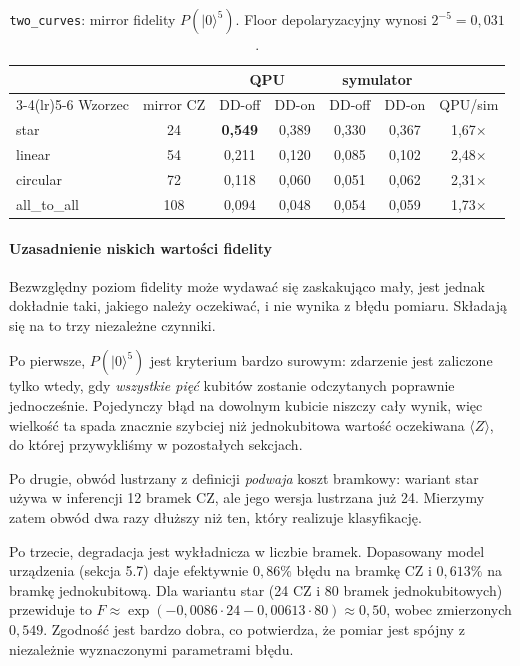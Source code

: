 \documentclass[11pt,a4paper]{article}
\begin{document}
\begin{table}[htbp]
\centering
\caption{\texttt{two\_curves}: mirror fidelity $P(|0\rangle^{5})$. Floor depolaryzacyjny
wynosi $2^{-5} = 0{,}031$.}
\begin{tabular}{@{}lc cc cc c@{}}
\toprule
& & \multicolumn{2}{c}{\textbf{QPU}} & \multicolumn{2}{c}{\textbf{symulator}} & \\
\cmidrule(lr){3-4}\cmidrule(lr){5-6}
Wzorzec & mirror CZ & DD-off & DD-on & DD-off & DD-on & QPU/sim \\
\midrule
star        & 24  & \textbf{0,549} & 0,389 & 0,330 & 0,367 & 1,67$\times$ \\
linear      & 54  & 0,211 & 0,120 & 0,085 & 0,102 & 2,48$\times$ \\
circular    & 72  & 0,118 & 0,060 & 0,051 & 0,062 & 2,31$\times$ \\
all\_to\_all & 108 & 0,094 & 0,048 & 0,054 & 0,059 & 1,73$\times$ \\
\bottomrule
\end{tabular}
\end{table}

\paragraph{Uzasadnienie niskich wartości fidelity} Bezwzględny poziom fidelity może wydawać
się zaskakująco mały, jest jednak dokładnie taki, jakiego należy oczekiwać, i nie wynika
z błędu pomiaru. Składają się na to trzy niezależne czynniki.

Po pierwsze, $P(|0\rangle^{5})$ jest kryterium bardzo surowym: zdarzenie jest zaliczone
tylko wtedy, gdy \emph{wszystkie pięć} kubitów zostanie odczytanych poprawnie
jednocześnie. Pojedynczy błąd na dowolnym kubicie niszczy cały wynik, więc wielkość ta
spada znacznie szybciej niż jednokubitowa wartość oczekiwana $\langle Z\rangle$, do której
przywykliśmy w pozostałych sekcjach.

Po drugie, obwód lustrzany z definicji \emph{podwaja} koszt bramkowy: wariant star używa
w inferencji 12 bramek CZ, ale jego wersja lustrzana już 24. Mierzymy zatem obwód dwa razy
dłuższy niż ten, który realizuje klasyfikację.

Po trzecie, degradacja jest wykładnicza w liczbie bramek. Dopasowany model urządzenia
(sekcja 5.7) daje efektywnie $0{,}86\%$ błędu na bramkę CZ i $0{,}613\%$ na bramkę
jednokubitową. Dla wariantu star (24 CZ i 80 bramek jednokubitowych) przewiduje to
$F \approx \exp(-0{,}0086\cdot 24 - 0{,}00613\cdot 80) \approx 0{,}50$, wobec zmierzonych
$0{,}549$. Zgodność jest bardzo dobra, co potwierdza, że pomiar jest spójny z niezależnie
wyznaczonymi parametrami błędu.
\end{document}
